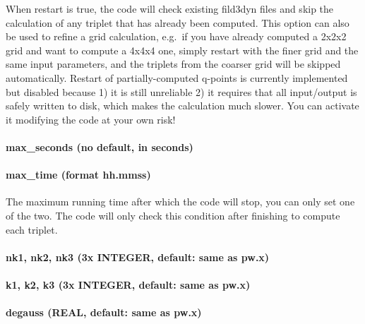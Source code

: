 \documentclass[
]{article}
\begin{document}
When restart is true, the code will check existing fild3dyn files and
skip the calculation of any triplet that has already been computed. This
option can also be used to refine a grid calculation, e.g.~if you have
already computed a 2x2x2 grid and want to compute a 4x4x4 one, simply
restart with the finer grid and the same input parameters, and the
triplets from the coarser grid will be skipped automatically. Restart of
partially-computed q-points is currently implemented but disabled
because 1) it is still unreliable 2) it requires that all input/output
is safely written to disk, which makes the calculation much slower. You
can activate it modifying the code at your own risk!

\hypertarget{max_seconds-no-default-in-seconds}{%
\paragraph{max\_seconds (no default, in
seconds)}\label{max_seconds-no-default-in-seconds}}

\hypertarget{max_time-format-hh.mmss}{%
\paragraph{max\_time (format hh.mmss)}\label{max_time-format-hh.mmss}}

The maximum running time after which the code will stop, you can only
set one of the two. The code will only check this condition after
finishing to compute each triplet.

\hypertarget{nk1-nk2-nk3-3x-integer-default-same-as-pw.x}{%
\paragraph{nk1, nk2, nk3 (3x INTEGER, default: same as
pw.x)}\label{nk1-nk2-nk3-3x-integer-default-same-as-pw.x}}

\hypertarget{k1-k2-k3-3x-integer-default-same-as-pw.x}{%
\paragraph{k1, k2, k3 (3x INTEGER, default: same as
pw.x)}\label{k1-k2-k3-3x-integer-default-same-as-pw.x}}

\hypertarget{degauss-real-default-same-as-pw.x}{%
\paragraph{degauss (REAL, default: same as
pw.x)}\label{degauss-real-default-same-as-pw.x}}
\end{document}
